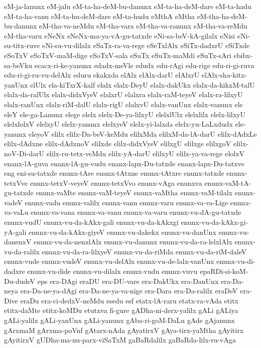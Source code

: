{eM-ja-lanunx
eM-jalu
eM-ta-ha-deM-bu-danunx
eM-ta-ha-deM-dare
eM-ta-hadu
eM-ta-ha-vanu
eM-ta-hu-deM-dare
eM-ta-hudu
eMthA
eMtha
eM-tha-ha-deM-bu-danunx
eM-tha-va-neMdu
eM-tha-vara
eM-tha-va-ranunx
eM-tha-va-reMdu
eM-tha-varu
eNeNx
eNeNx-ma-ya-vA-gu-tatxde
eNi-sa-beV-kA-gilalx
eNisi
eNi-su-titx-ruve
eNi-su-vu-dilalx
eSaTx-ra-va-rege
eSeTxlAlx
eSiTx-dadxrU
eSiTxde
eSoTxV
eSoTxV-maM-dige
eSoTxV-sala
eSuTx
eSuTx-maMdi
eSuTx-sAri
ebibx-sa-beVku
ecacx-ri-ke-yanunx
edadx-meVle
edudx
edu-rAgi
edu-rige
edu-ri-gi-ruva
edu-ri-gi-ru-vu-delAlx
eduru
ekakxda
elAlx
elAlx-darU
elAlxrU
elAlx-sha-kitx-yanUnx
elUlx
ela-kiTxrX-kalf
elalx
elalx-DeyU
elalx-dakUkx
elalx-da-kikxM-talU
elalx-da-ralUlx
elalx-didxVyeV
elalxrU
elalxra
elalx-raM-teyeV
elalx-ra-lilxyU
elalx-ranUnx
elalx-riM-dalU
elalx-rigU
elalxvU
elalx-vanUnx
elalx-vanunx
ele
eleY
ele-ga-Lanunx
elege
elelx
elelx-De-ya-lilxyU
elelxlUlx
elelxlilx
elelx-lilxyU
elelxlolxV
elelxyU
elelx-yanunx
elelxyeV
elelx-yi-lalxda
elelx-yu-LaLxdudx
ele-yanunx
eleyoV
elilx
elilx-Da-beV-keMdu
elilxMda
elilxM-da-lA-darU
elilx-dAdxLe
elilx-dAdxne
elilx-dAdxnoV
elilxde
elilx-didxVyeV
elilxgU
elilxge
elilxgoV
elilx-noV-Di-darU
elilx-ru-tetx-veMdu
elilx-yA-darU
elilxyU
elilx-ya-va-rege
elolxV
enanx-lA-guva
enanx-lA-gu-vudu
enanx-lapx-Du-tatxde
enanx-lapx-Du-tatxve
eng
eni-su-tatxde
enunx-tAre
enunx-tAtxne
enunx-tAtxre
enunx-tatxde
enunx-tetxVve
enunx-tetxV-veyeV
enunx-tetxVvo
enunx-vAga
enunxva
enunx-vaM-tA-gu-tatxde
enunx-vaMte
enunx-vaM-teyeV
enunx-vaMtha
enunx-vaM-tilalx
enunx-vadeV
enunx-vadu
enunx-valilx
enunx-vanu
enunx-varu
enunx-va-va-Lige
enunx-va-vaLu
enunx-va-vana
enunx-va-vanu
enunx-va-varu
enunx-vu-dA-gu-tatxde
enunx-vudU
enunx-vu-da-kAkx-gali
enunx-vu-da-kAkxgi
enunx-vu-da-kAkx-gi-yA-gali
enunx-vu-da-kAkx-giyeV
enunx-vu-dakekx
enunx-vu-danUnx
enunx-vu-danenxV
enunx-vu-da-nenxlAlx
enunx-vu-danunx
enunx-vu-da-ra-lelxlAlx
enunx-vu-da-ralilx
enunx-vu-da-ra-lilxyeV
enunx-vu-da-riMda
enunx-vu-da-riM-daleV
enunx-vude
enunx-vudeV
enunx-vu-delAlx
enunx-vu-de-lalx-vanUnx
enunx-vu-di-dadxre
enunx-vu-dide
enunx-vu-dilalx
enunx-vudu
enunx-vuvu
epaRDi-si-koM-Du-dudeV
eps
era-DAgi
eraDU
era-DU-vare
era-DakUkx
era-DanUnx
era-Da-neya
era-Da-ne-ya-dAgi
era-Da-ne-ya-va-nige
era-Dara
era-Da-ralilx
eraDeV
era-Dive
eraDu
era-ci-dedxV-neMdu
esedu
esf
etatx-lA-raru
etatx-ra-vAda
etitx
etitx-daMte
etitx-koMDu
etutxva
fi-gure
gADha-ni-derx-yalilx
gALi
gALiya
gALi-yalilx
gALi-yanUnx
gALi-yanunx
gAba-ri-goM-DaLu
gAde
gAjanunx
gArxmaM
gArxma-poVnf
gAtarx-nAda
gAyatirxV
gAya-tirx-yaMtha
gAyitirx
gAyitirxV
gUDha-ma-nu-parx-viSaTxM
gaBaRdalilx
gaBaRda-lilx-ru-vAga
}
